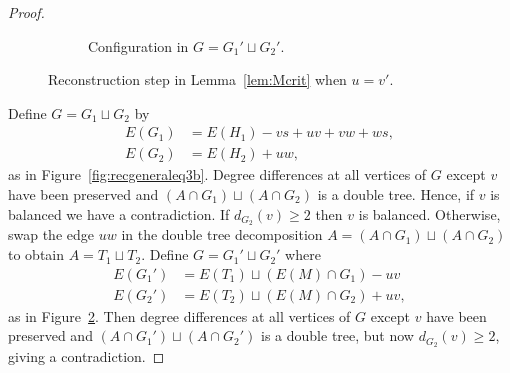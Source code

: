 \documentclass[11pt, reqno, a4paper]{article}
\theoremstyle{definition}
\numberwithin{equation}{section}
\renewcommand{\geq}{\geqslant}
\begin{document}
\begin{proof}
\begin{figure}[ht]
\begin{subfigure}{0.4\textwidth}
	\caption{Configuration in $G=G_1'\sqcup G_2'$.}
	\label{fig:recgeneral3eqc}
    \end{subfigure}
    \caption{Reconstruction step in Lemma~\ref{lem:Mcrit} when $u = v'$.}
\end{figure}

Define $G = G_1 \sqcup G_2$ by 
\begin{align*}
E(G_1) &= E(H_1) - vs + uv + vw + ws, \\
E(G_2) &= E(H_2) + uw,
\end{align*}
as in Figure~\ref{fig:recgeneraleq3b}.
Degree differences at all vertices of $G$ except $v$ have been preserved and $(A\cap G_1)\sqcup (A\cap G_2)$ is a double tree.
Hence, if $v$ is balanced we have a contradiction.
If $d_{G_2}(v)\geq 2$ then $v$ is balanced.
Otherwise, swap the edge $uw$ in the double tree decomposition $A= (A\cap G_1)\sqcup (A\cap G_2)$ to obtain $A = T_1 \sqcup T_2$.
Define $G=G_1'\sqcup G_2'$ where 
\begin{align*}
E(G_1') &= E(T_1) \sqcup (E(M)\cap G_1) - uv \\
E(G_2') &= E(T_2) \sqcup (E(M)\cap G_2) + uv,
\end{align*}
as in Figure~\ref{fig:recgeneral3eqc}.
Then degree differences at all vertices of $G$ except $v$ have been preserved and $(A\cap G_1')\sqcup (A\cap G_2')$ is a double tree, but now $d_{G_2}(v) \geq 2$, giving a contradiction.


\end{proof}
\end{document}
